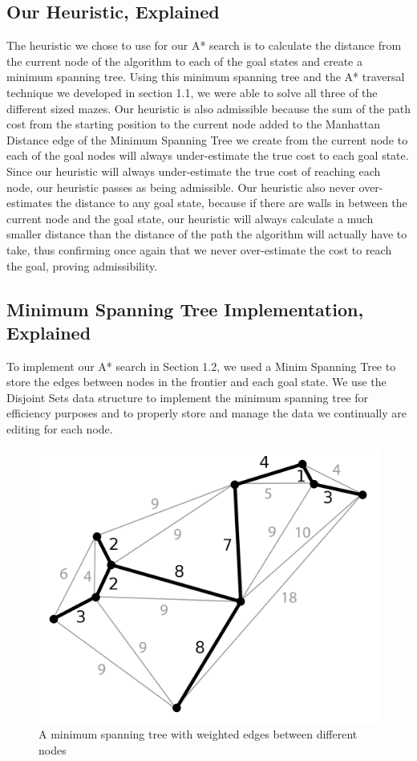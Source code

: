 \documentclass[titlepage]{article}
\begin{document}
\newpage

\subsection{Our Heuristic, Explained}
The heuristic we chose to use for our A* search is to calculate the distance from the current node of the algorithm to each of the goal states and create a minimum spanning tree. Using this minimum spanning tree and the A* traversal technique we developed in section 1.1, we were able to solve all three of the different sized mazes. Our heuristic is also admissible because the sum of the path cost from the starting position to the current node added to the Manhattan Distance edge of the Minimum Spanning Tree we create from the current node to each of the goal nodes will always under-estimate the true cost to each goal state. Since our heuristic will always under-estimate the true cost of reaching each node, our heuristic passes as being admissible. Our heuristic also never over-estimates the distance to any goal state, because if there are walls in between the current node and the goal state, our heuristic will always calculate a much smaller distance than the distance of the path the algorithm will actually have to take, thus confirming once again that we never over-estimate the cost to reach the goal, proving admissibility. 

\subsection{Minimum Spanning Tree Implementation, Explained}
To implement our A* search in Section 1.2, we used a Minim Spanning Tree to store the edges between nodes in the frontier and each goal state. We use the Disjoint Sets data structure to implement the minimum spanning tree for efficiency purposes and to properly store and manage the data we continually are editing for each node.

\newpage

\begin{figure}[h!]
\includegraphics[width=\linewidth]{mst.png}
\caption{A minimum spanning tree with weighted edges between different nodes}
\label{fig:MST}
\end{figure}
\end{document}
